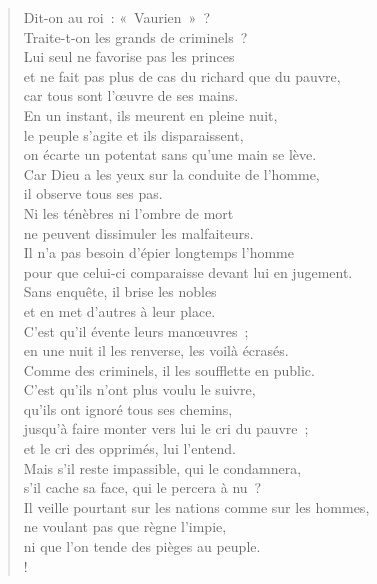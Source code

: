 \documentclass[french,twoside]{book} %
\def\mednobreak{\ifdim\lastskip<\medskipamount
  \removelastskip\nopagebreak\medskip\fi}
\newcommand{\labelblock}[1]{\medbreak{\noindent\color{rubric}\bfseries #1}\par\mednobreak}
\begin{document}
\begin{verse}
Dit-on au roi : « Vaurien » ? \\
Traite-t-on les grands de criminels ?\\
Lui seul ne favorise pas les princes \\
et ne fait pas plus de cas du richard que du pauvre, \\
car tous sont l’œuvre de ses mains.\\
En un instant, ils meurent en pleine nuit, \\
le peuple s’agite et ils disparaissent, \\
on écarte un potentat sans qu’une main se lève.\\
Car Dieu a les yeux sur la conduite de l’homme, \\
il observe tous ses pas.\\
Ni les ténèbres ni l’ombre de mort \\
ne peuvent dissimuler les malfaiteurs.\\
Il n’a pas besoin d’épier longtemps l’homme \\
pour que celui-ci comparaisse devant lui en jugement.\\
Sans enquête, il brise les nobles \\
et en met d’autres à leur place.\\
C’est qu’il évente leurs manœuvres ; \\
en une nuit il les renverse, les voilà écrasés.\\
Comme des criminels, il les soufflette en public.\\
C’est qu’ils n’ont plus voulu le suivre, \\
qu’ils ont ignoré tous ses chemins,\\
jusqu’à faire monter vers lui le cri du pauvre ; \\
et le cri des opprimés, lui l’entend.\\
Mais s’il reste impassible, qui le condamnera, \\
s’il cache sa face, qui le percera à nu ? \\
Il veille pourtant sur les nations comme sur les hommes,\\
ne voulant pas que règne l’impie, \\
ni que l’on tende des pièges au peuple.\\!
\end{verse}

\labelblock{La révolte de Job}
\end{document}
